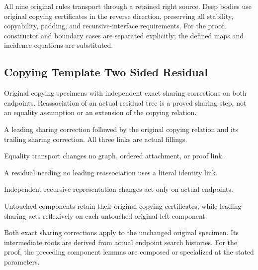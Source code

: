 All nine original rules transport through a retained right source. Deep bodies use original copying certificates in the reverse direction, preserving all stability, copyability, padding, and recursive-interface requirements.
For the proof, constructor and boundary cases are separated explicitly; the defined maps and incidence equations are substituted.
\par{}

\subsection{Copying Template Two Sided Residual}
Original copying specimens with independent exact sharing corrections on both endpoints. Reassociation of an actual residual tree is a proved sharing step, not an equality assumption or an extension of the copying relation.

A leading sharing correction followed by the original copying relation and its trailing sharing correction. All three links are actual fillings.
\par{}

Equality transport changes no graph, ordered attachment, or proof link.
\par{}

A residual needing no leading reassociation uses a literal identity link.
\par{}

Independent recursive representation changes act only on actual endpoints.
\par{}

Untouched components retain their original copying certificates, while leading sharing acts reflexively on each untouched original left component.
\par{}

Both exact sharing corrections apply to the unchanged original specimen. Its intermediate roots are derived from actual endpoint search histories.
For the proof, the preceding component lemmas are composed or specialized at the stated parameters.
\par{}

